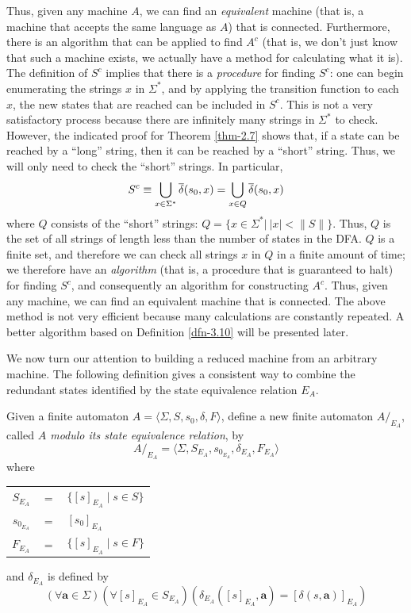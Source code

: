Thus, given any machine $A$, we can find an \emph{equivalent} machine
(that is, a machine that accepts the same language as $A$) that is connected.
Furthermore, there is an algorithm that can be applied to find $A^c$ (that is,
we don't just know that such a machine exists, we actually have a method for
calculating what it is). The definition of $S^c$ implies that there is a
\emph{procedure} for finding $S^c$: one can begin enumerating the strings $x$ in
$\Sigma^*$, and by applying the transition function to each $x$, the new states
that are reached can be included in $S^c$. This is not a very satisfactory
process because there are infinitely many strings in $\Sigma^*$ to check.
However, the indicated proof for Theorem \ref{thm-2.7} shows that, if a state can be
reached by a ``long'' string, then it can be reached by a ``short'' string.
Thus, we will only need to check the ``short'' strings. In particular,
\[ S^c \equiv \bigcup\limits_{x \in \Sigma^*} \overline{\delta}(s_0,x) =
	\bigcup\limits_{x \in Q} \overline{\delta}(s_0,x) \]
where $Q$ consists of the ``short'' strings:
$Q =\{x \in \Sigma^*|\ |x| < \|S\|\}$. Thus, $Q$ is the set of all strings of
length less than the number of states in the DFA. $Q$ is a finite set, and
therefore we can check all strings $x$ in $Q$ in a finite amount of time; we
therefore have an \emph{algorithm} (that is, a procedure that is guaranteed to halt)
for finding $S^c$, and consequently an algorithm for constructing $A^c$. Thus,
given any machine, we can find an equivalent machine that is connected. The
above method is not very efficient because many calculations are constantly
repeated. A better algorithm based on Definition \ref{dfn-3.10} will be presented later.

We now turn our attention to building a reduced machine from an arbitrary
machine. The following definition gives a consistent way to combine the
redundant states identified by the state equivalence relation $E_A$.

\begin{dfn}\label{dfn-3.8}
Given a finite automaton $A =\langle\Sigma,S,s_0,\delta,F\rangle$, define a new
finite automaton $A/  _{E_A}$, called \emph{$A$ modulo its state equivalence
relation}, by
\[ A/_{E_A} =\langle\Sigma,S_{E_A},s_{0_{E_A}},\delta_{E_A},F_{E_A}\rangle \]
where
\begin{center}
\begin{tabular}{rcl}
$S_{E_A}$ & $=$ & $\{[s]_{E_A} \mid s \in S\}$ \\
$s_{0_{E_A}}$ & $=$ & $[s_0]_{E_A}$ \\
$F_{E_A}$ & $=$ & $\{[s]_{E_A} \mid s \in F\}$
\end{tabular}
\end{center}
and $\delta_{E_A}$ is defined by
\[ (\forall \pmb{a} \in \Sigma)(\forall[s]_{E_A} \in S_{E_A})(\delta_{E_A}([s]_{E_A},\pmb{a}) =
	[\delta(s,\pmb{a})]_{E_A}) \]
\end{dfn}

